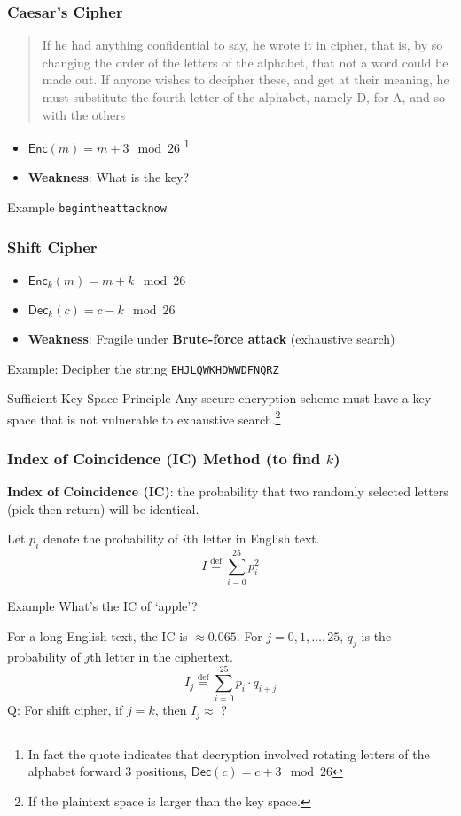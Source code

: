 \begin{frame}[fragile]\frametitle{Caesar's Cipher}
\begin{quote}
If he had anything confidential to say, he wrote it in cipher, that is, by so changing the order of the letters of the alphabet, that not a word could be made out. If anyone wishes to \alert{decipher} these, and get at their meaning, he must \alert{substitute the fourth letter of the alphabet, namely D, for A}, and so with the others

\end{quote}
\begin{itemize}
	\item $\mathsf{Enc}(m)=m+3\mod 26$ \footnote{In fact the quote indicates that decryption involved rotating letters of the alphabet forward 3 positions, $\mathsf{Dec}(c)=c+3\mod 26$}
	\item \textbf{Weakness}: \alert{What is the key?}
\end{itemize}
\begin{exampleblock}{Example}
\verb|begintheattacknow|
\end{exampleblock}
\end{frame}
\begin{frame}[fragile]\frametitle{Shift Cipher}
\begin{itemize}
\item $\mathsf{Enc}_k(m)=m+k\mod 26$
\item $\mathsf{Dec}_k(c)=c-k\mod 26$
\item \textbf{Weakness}: Fragile under \textbf{Brute-force attack} (exhaustive search)
\end{itemize}
\begin{exampleblock}{Example: Decipher the string}	
\verb|EHJLQWKHDWWDFNQRZ|
\end{exampleblock}
\begin{alertblock}{Sufficient Key Space Principle}
Any secure encryption scheme must have a key space that is not vulnerable to exhaustive search.\footnote{If the plaintext space is larger than the key space.}
\end{alertblock}
\end{frame}
\begin{frame}\frametitle{Index of Coincidence (IC) Method (to find $k$)}
\textbf{Index of Coincidence (IC)}: the probability that two randomly selected letters (pick-then-return) will be identical.

Let $p_i$ denote the probability of $i$th letter in English text.
\[I \overset{\text{def}}{=}\sum_{i=0}^{25} p_i^2 \]
\begin{exampleblock}{Example}
What's the IC of `apple'?
\end{exampleblock}

For a long English text, the IC is $\approx 0.065$.
For $j = 0, 1, \dotsc , 25$, $q_j$ is the probability of $j$th letter in the ciphertext.
\[I_j \overset{\text{def}}{=}\sum_{i=0}^{25} p_i \cdot q_{i+j}\]
\alert{Q: For shift cipher, if $j = k$, then $I_j \approx$ ?}
\end{frame}

